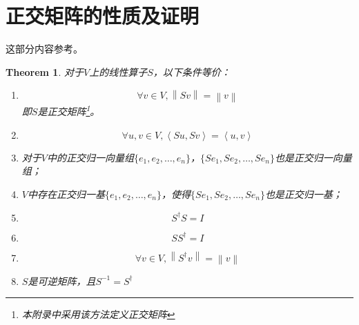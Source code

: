 \documentclass[12pt,a4paper,openany,twoside]{book}
\newtheorem{theorem}{Theorem}[section]
\numberwithin{equation}{section}
\begin{document}
    \newpage
    \appendix
    \appendixname
    \addappheadtotoc
      \renewcommand\thesection{\Alph{section}}
      \section{正交矩阵的性质及证明}
        \label{orthogonal_matrix_properties}
        这部分内容参考\cite{linear_algebra_done_right}。
        \begin{theorem}
          对于$V$上的线性算子$S$，以下条件等价：
          \begin{enumerate}
            \item
              \begin{equation}
                \forall v\in V, \left\|Sv\right\|=\left\|v\right\|
              \end{equation}
              即$S$是正交矩阵\footnote{本附录中采用该方法定义正交矩阵}。
            \item
              \begin{equation}
                \forall u,v\in V, \left\langle Su,Sv\right\rangle=\left\langle u,v\right\rangle
              \end{equation}
            \item 对于$V$中的正交归一向量组$\{e_1,e_2,\dots,e_n\}$，$\{Se_1,Se_2,\dots,Se_n\}$也是正交归一向量组；
            \item $V$中存在正交归一基$\{e_1,e_2,\dots,e_n\}$，使得$\{Se_1,Se_2,\dots,Se_n\}$也是正交归一基；
            \item
              \begin{equation}
                S^\dagger S=I
              \end{equation}
            \item 
              \begin{equation}
                SS^\dagger=I
              \end{equation}
            \item
              \begin{equation}
                \forall v\in V, \left\|S^\dagger v\right\|=\left\|v\right\|
              \end{equation}
            \item $S$是可逆矩阵，且$S^{-1}=S^\dagger$
          \end{enumerate}
        \end{theorem}
\end{document}
